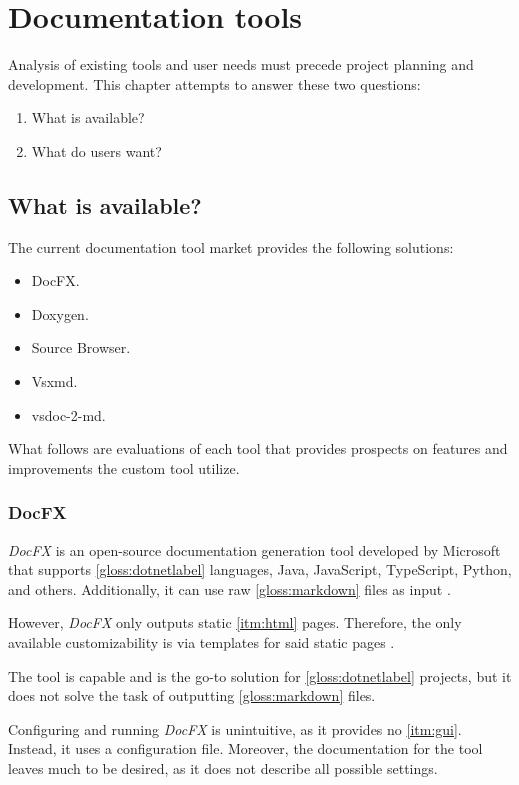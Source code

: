 \chapter{Documentation tools}

Analysis of existing tools and user needs must precede project planning and development. This chapter attempts to answer these two questions:
\begin{enumerate}
    \item What is available?
    \item What do users want?
\end{enumerate}

\section{What is available?} \label{sec:whatisavailable}
The current documentation tool market provides the following solutions:

\begin{itemize}
    \item DocFX.
    \item Doxygen.
    \item Source Browser.
    \item Vsxmd.
    \item vsdoc-2-md.
\end{itemize}

What follows are evaluations of each tool that provides prospects on features and improvements the custom tool utilize.

\subsection{DocFX} \label{ssec:docfx}

\textit{DocFX} is an open-source documentation generation tool developed by Microsoft that supports \ref{gloss:dotnetlabel} languages, Java, JavaScript, TypeScript, Python, and others. Additionally, it can use raw \ref{gloss:markdown} files as input \cite{wei_docfx_2020}.

However, \textit{DocFX} only outputs static \ref{itm:html} pages. Therefore, the only available customizability is via templates for said static pages \cite{wei_docfx_2020}.

The tool is capable and is the go-to solution for \ref{gloss:dotnetlabel} projects, but it does not solve the task of outputting \ref{gloss:markdown} files.

Configuring and running \textit{DocFX} is unintuitive, as it provides no \ref{itm:gui}. Instead, it uses a configuration file. Moreover, the documentation for the tool leaves much to be desired, as it does not describe all possible settings.

